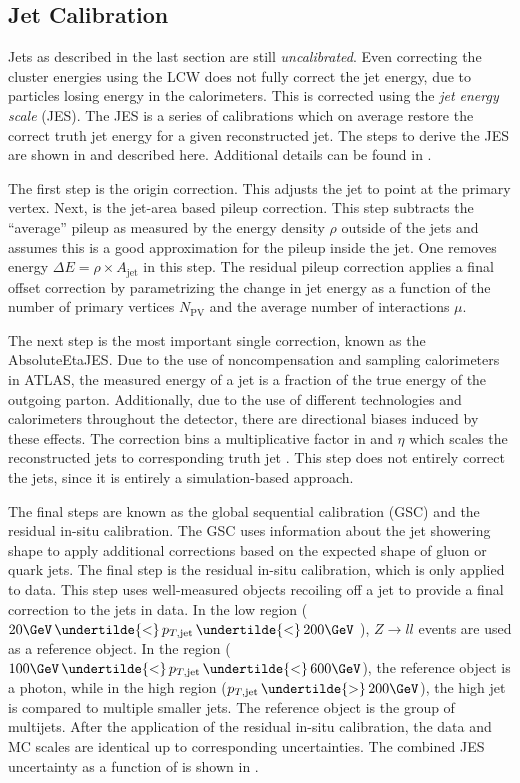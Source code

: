 \subsection{Jet Calibration}

Jets as described in the last section are still \textit{uncalibrated}.
Even correcting the cluster energies using the LCW does not fully correct the jet energy, due to particles losing energy in the calorimeters.
This is corrected using the \textit{jet energy scale} (JES).
The JES is a series of calibrations which on average restore the correct truth jet energy for a given reconstructed jet.
The steps to derive the JES are shown in  and described here.
Additional details can be found in \cite{PERF-2012-01}.

The first step is the origin correction.
This adjusts the jet to point at the primary vertex.
Next, is the jet-area based pileup correction.
This step subtracts the ``average'' pileup as measured by the energy density $\rho$ outside of the jets and assumes this is a good approximation for the pileup inside the jet.
One removes energy $\Delta E = \rho \times A_{\text{jet}}$ in this step.
The residual pileup correction applies a final offset correction by parametrizing the change in jet energy as a function of the number of primary vertices $N_{\text{PV}}$ and the average number of interactions $\mu$.

The next step is the most important single correction, known as the \mbox{AbsoluteEtaJES}.
Due to the use of noncompensation and sampling calorimeters in ATLAS, the measured energy of a jet is a fraction of the true energy of the outgoing parton.
Additionally, due to the use of different technologies and calorimeters throughout the detector, there are directional biases induced by these effects.
The correction bins a multiplicative factor in \pt and $\eta$ which scales the reconstructed jets to corresponding truth jet \pt.
This step does not entirely correct the jets, since it is entirely a simulation-based approach.

The final steps are known as the global sequential calibration (GSC) and the residual in-situ calibration.
The GSC uses information about the jet showering shape to apply additional corrections based on the expected shape of gluon or quark jets.
The final step is the residual in-situ calibration, which is only applied to data.
This step uses well-measured objects recoiling off a jet to provide a final correction to the jets in data.
In the low \pt region ($20 \GeV \, \undertilde{<} \, p_{T,\text{jet}} \, \undertilde{<} \, 200 \GeV $ ), $Z \rightarrow ll$ events are used as a reference object.
In the \pt region ($100 \GeV \, \undertilde{<} \, p_{T,\text{jet}} \, \undertilde{<} \, 600 \GeV $), the reference object is a photon, while in the high \pt region ($p_{T,\text{jet}} \, \undertilde{>} \, 200 \GeV $), the high \pt jet is compared to multiple smaller \pt jets.
The reference object is the group of multijets.
After the application of the residual in-situ calibration, the data and MC scales are identical up to corresponding uncertainties.
The combined JES uncertainty as a function of \pt is shown in .

